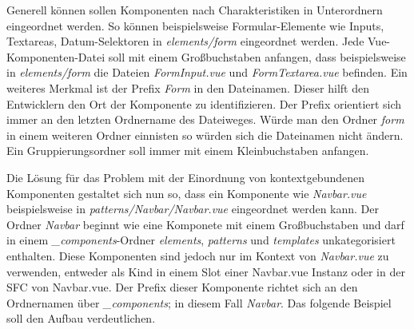 Generell können sollen Komponenten nach Charakteristiken in Unterordnern eingeordnet werden. So können beispielsweise Formular-Elemente wie Inputs, Textareas, Datum-Selektoren in \textit{elements/form} eingeordnet werden. Jede Vue-Komponenten-Datei soll mit einem Großbuchstaben anfangen, dass beispielsweise in \textit{elements/form} die Dateien \textit{FormInput.vue} und \textit{FormTextarea.vue} befinden. Ein weiteres Merkmal ist der Prefix \textit{Form} in den Dateinamen. Dieser hilft den Entwicklern den Ort der Komponente zu identifizieren. Der Prefix orientiert sich immer an den letzten Ordnername des Dateiweges. Würde man den Ordner \textit{form} in einem weiteren Ordner einnisten so würden sich die Dateinamen nicht ändern. Ein Gruppierungsordner soll immer mit einem Kleinbuchstaben anfangen.

Die Lösung für das Problem mit der Einordnung von kontextgebundenen Komponenten gestaltet sich nun so, dass ein Komponente wie \textit{Navbar.vue} beispielsweise in \textit{patterns/Navbar/Navbar.vue} eingeordnet werden kann. Der Ordner \textit{Navbar} beginnt wie eine Komponete mit einem Großbuchstaben und darf in einem \textit{\_components}-Ordner \textit{elements}, \textit{patterns} und \textit{templates} unkategorisiert enthalten. Diese Komponenten sind jedoch nur im Kontext von \textit{Navbar.vue} zu verwenden, entweder als Kind in einem Slot einer Navbar.vue Instanz oder in der SFC von Navbar.vue. Der Prefix dieser Komponente richtet sich an den Ordnernamen über \textit{\_components}; in diesem Fall \textit{Navbar}. Das folgende Beispiel soll den Aufbau verdeutlichen. 




